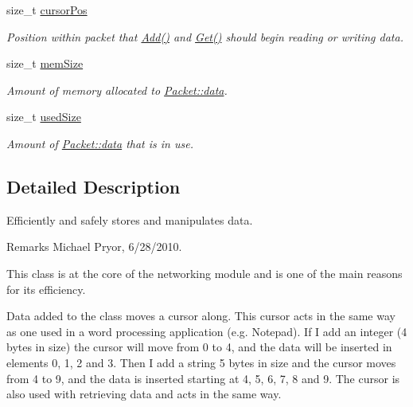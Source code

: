 \begin{DoxyCompactItemize}
size\_\-t \hyperlink{class_packet_acce561b50a43897e8fd0c03222b617bd}{cursorPos}
\begin{DoxyCompactList}\small\item\em Position within packet that \hyperlink{class_packet_ae9adff3647758cc7f8eb4c7d132e7ba4}{Add()} and \hyperlink{class_packet_a80e211740ec18468ac623e2a333234e0}{Get()} should begin reading or writing data. \item\end{DoxyCompactList}\item 
\hypertarget{class_packet_a1c2e5054d27221467e8db5dc9e71c04a}{
size\_\-t \hyperlink{class_packet_a1c2e5054d27221467e8db5dc9e71c04a}{memSize}}
\label{class_packet_a1c2e5054d27221467e8db5dc9e71c04a}

\begin{DoxyCompactList}\small\item\em Amount of memory allocated to \hyperlink{class_packet_a6ce50b69127890b9012cb91f287f137f}{Packet::data}. \item\end{DoxyCompactList}\item 
\hypertarget{class_packet_a1da1eb4f461522942bada139f0d94acd}{
size\_\-t \hyperlink{class_packet_a1da1eb4f461522942bada139f0d94acd}{usedSize}}
\label{class_packet_a1da1eb4f461522942bada139f0d94acd}

\begin{DoxyCompactList}\small\item\em Amount of \hyperlink{class_packet_a6ce50b69127890b9012cb91f287f137f}{Packet::data} that is in use. \item\end{DoxyCompactList}\end{DoxyCompactItemize}


\subsection{Detailed Description}
Efficiently and safely stores and manipulates data. \begin{DoxyRemark}{Remarks}
Michael Pryor, 6/28/2010.
\end{DoxyRemark}
This class is at the core of the networking module and is one of the main reasons for its efficiency.\par
\par


Data added to the class moves a cursor along. This cursor acts in the same way as one used in a word processing application (e.g. Notepad). If I add an integer (4 bytes in size) the cursor will move from 0 to 4, and the data will be inserted in elements 0, 1, 2 and 3. Then I add a string 5 bytes in size and the cursor moves from 4 to 9, and the data is inserted starting at 4, 5, 6, 7, 8 and 9. The cursor is also used with retrieving data and acts in the same way.\par
\par


